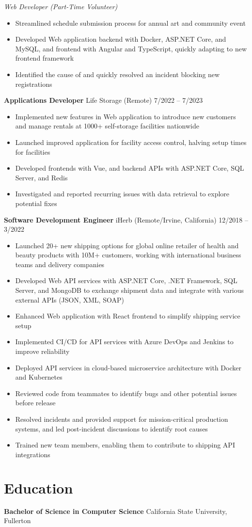 \documentclass[12pt]{article}
\newcommand{\primaryheader}[4]{\textbf{#1} \symbol{"B7} #3 (#4) \hfill #2}
\newcommand{\secondaryheader}[2]{\begin{adjustwidth}{0.25in}{}\textit{#1} \hfill #2\end{adjustwidth}}
\begin{document}
	\secondaryheader{Web Developer (Part-Time Volunteer)}{}

	\begin{itemize}
		\item Streamlined schedule submission process for annual art and community event
		\item Developed Web application backend with Docker, ASP.NET Core, and MySQL, and frontend with Angular and TypeScript, quickly adapting to new frontend framework
		\item Identified the cause of and quickly resolved an incident blocking new registrations
	\end{itemize}

	\primaryheader{Applications Developer}{7/2022 -- 7/2023}{Life Storage}{Remote}

	\begin{itemize}
		\item Implemented new features in Web application to introduce new customers and manage rentals at 1000+ self-storage facilities nationwide
		\item Launched improved application for facility access control, halving setup times for facilities
		\item Developed frontends with Vue, and backend APIs with ASP.NET Core, SQL Server, and Redis
		\item Investigated and reported recurring issues with data retrieval to explore potential fixes
	\end{itemize}

	\primaryheader{Software Development Engineer}{12/2018 -- 3/2022}{iHerb}{Remote/Irvine, California}

	\begin{itemize}
		\item Launched 20+ new shipping options for global online retailer of health and beauty products with 10M+ customers, working with international business teams and delivery companies
		\item Developed Web API services with ASP.NET Core, .NET Framework, SQL Server, and MongoDB to exchange shipment data and integrate with various external APIs (JSON, XML, SOAP)
		\item Enhanced Web application with React frontend to simplify shipping service setup
		\item Implemented CI/CD for API services with Azure DevOps and Jenkins to improve reliability
		\item Deployed API services in cloud-based microservice architecture with Docker and Kubernetes
		\item Reviewed code from teammates to identify bugs and other potential issues before release
		\item Resolved incidents and provided support for mission-critical production systems, and led post-incident discussions to identify root causes
		\item Trained new team members, enabling them to contribute to shipping API integrations
	\end{itemize}

	\section*{Education}

	\textbf{Bachelor of Science in Computer Science}  California State University, Fullerton
\end{document}
